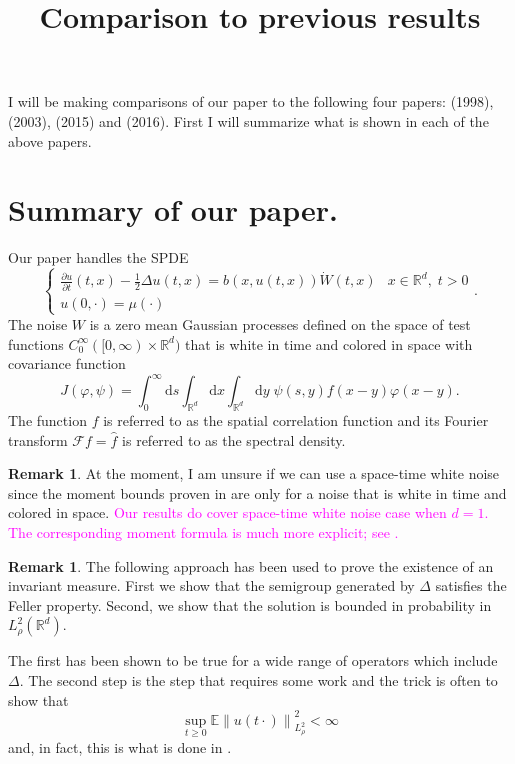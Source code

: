 \documentclass[a4paper,11pt]{article}%
\title{Comparison to previous results}
\numberwithin{equation}{section}
\theoremstyle{plain}
\theoremstyle{definition}
\newtheorem{remark}[theorem]{Remark}
\newcommand{\R}{\mathbb{R}}
\newcommand{\Norm}[1]{\left\|  #1   \right\|}
\newcommand{\ud}{\ensuremath{ \mathrm{d} }}
\begin{document}
I will be making comparisons of our paper to the following four papers: \cite{TessitoreZabczyk98M} (1998), \cite{AM03} (2003), \cite{MSY15} (2015) and \cite{MSY16} (2016). First I will summarize what is shown in each of the above papers.

\tableofcontents

\section{Summary of our paper.}

Our paper handles the SPDE
	\begin{equation}\label{E:gspde}
		\begin{cases}
			\frac{\partial u}{\partial t}(t,x) - \frac{1}{2}\Delta u(t,x) = b(x,u(t,x))\dot{W}(t,x) & x\in \R^d, \; t>0
			\\ u(0,\cdot) = \mu(\cdot)
		\end{cases}.
	\end{equation}
The noise $W$ is a zero mean Gaussian processes defined on the space of test functions $C^{\infty}_0([0,\infty) \times \R^d)$ that is white in time and colored in space with covariance function
	\[
		J(\varphi, \psi) = \int_0^\infty \ud s \int_{\R^d} \ud x \int_{\R^d} \ud y \; \psi(s,y) f(x-y) \varphi(x-y).
	\]
The function $f$ is referred to as the spatial correlation function and its Fourier transform $\mathcal{F}f = \hat{f}$ is referred to as the spectral density.

	\begin{remark}
		At the moment, I am unsure if we can use a space-time white noise since the moment bounds proven in \cite{CH16Comparison} are only for a noise that is white in time and colored in space.
		\textcolor{magenta}{Our results do cover space-time white noise case when $d=1$. The corresponding moment formula is
		much more explicit;  see \cite{ChenDalang13Heat}.}
	\end{remark}

	\begin{remark}
		The following approach has been used to prove the existence of an invariant measure. First we show that the semigroup generated by $\Delta$ satisfies the Feller property. Second, we show that the solution is bounded in probability in $L^2_{\rho}(\R^d)$.

		The first has been shown to be true for a wide range of operators which include $\Delta$. The second step is the step that requires some work and the trick is often to show that
			\[
				\sup_{t \ge 0} \mathbb{E}\Norm{u(t\cdot)}_{L^2_{\rho}}^2 < \infty
			\]
		and, in fact, this is what is done in \cite{AM03, MSY15,MSY16,TessitoreZabczyk98M}.
	\end{remark}
\end{document}
